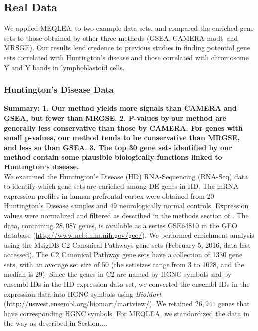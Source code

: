 \documentclass[a4,center,fleqn]{NAR}
\newcommand{\OurMethod}{MEQLEA}
\newcommand{\CMT}{CAMERA-modt}
\newcommand{\genr}{MRSGE}
\begin{document}
	\subsection{Real Data}\label{section:realdata}
	We applied \OurMethod~to two example data sets, and compared the enriched gene sets to those
	obtained by other three methods (GSEA, \CMT~and \genr). %
	Our results lend credence to previous studies in finding potential gene sets correlated with
	Huntington's disease and those correlated with chromosome Y and Y bands in lymphoblastoid cells.  
	
	\subsubsection{Huntington's Disease Data}
	\textbf{Summary: 1. Our method yields more signals than CAMERA and GSEA, but fewer than MRGSE. 2. P-values by our method are generally less conservative than those by CAMERA. For genes with small p-values, our method tends to be conservative than MRGSE, and less so than GSEA. 3. The top 30 gene sets identified by our method contain some plausible biologically functions linked to Huntington's disease.}\\
	
	We examined the Huntington's Disease (HD) RNA-Sequencing (RNA-Seq) data \citep{labadorf2015rna}  to
	identify which gene sets are enriched among DE genes in HD. The mRNA expression profiles in human
	prefrontal cortex were obtained from 20 Huntington's Disease samples and 49 neurologically normal
	controls.  Expression values were normalized and filtered as described in the methods section of
	\cite{labadorf2015rna}.
	The data, containing $28,087$ genes, is available as a series GSE64810 in the GEO database
	(\url{http://www.ncbi.nlm.nih.gov/geo/}). We performed enrichment analysis using the MsigDB
	\citep{subramanian2005gene} C2 Canonical Pathways gene sets (February 5, 2016, data last accessed).
	The C2 Canonical Pathway gene sets have a collection of 1330 gene sets, with an average set size of
	50 (the set sizes range from 3 to 1028, and the median is 29). Since the genes in C2 are named by
	HGNC symbols and by ensembl IDs in the HD expression data set, we converted the ensembl IDs in the
	expression data into HGNC symbols using \textit{BioMart}
	(\url{http://uswest.ensembl.org/biomart/martview/}). We retained $26,941$ genes that have
	corresponding HGNC symbols. For \OurMethod, we standardized the data in the way as described in
	Section....
	
\end{document}
